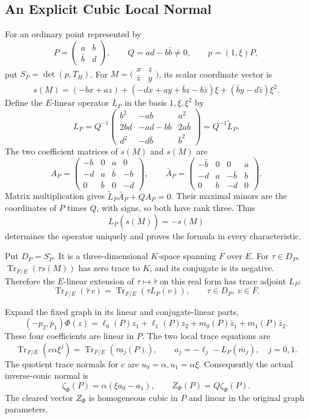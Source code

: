 \documentclass[12pt,letterpaper,onecolumn]{article}
\theoremstyle{definition}
\theoremstyle{remark}
\DeclareMathOperator{\Tr}{Tr}
\begin{document}
\subsection{An Explicit Cubic Local Normal}
For an ordinary point represented by
\[
P=\begin{pmatrix}a&b\\\bar b&d\end{pmatrix},\qquad
Q=ad-b\bar b\ne0,\qquad p=(1,\xi)P,
\]
put \(S_P=\det(p,T_H)\). For \(M=\bigl(\begin{smallmatrix}x&z\\\bar z&y\end{smallmatrix}\bigr)\), its scalar coordinate vector is
\[
s(M)=(-bx+az)+(-dx+ay+\bar bz-b\bar z)\xi
 +(\bar by-d\bar z)\xi^2.
\]
Define the \(E\)-linear operator \(L_P\) in the basis \(1,\xi,\xi^2\) by
\begin{equation}\label{eq:core-real-adjoint}
L_P=Q^{-1}
\begin{pmatrix}
b^2&-ab&a^2\\
2bd&-ad-b\bar b&2a\bar b\\
d^2&-d\bar b&\bar b^2
\end{pmatrix}=Q^{-1}\widetilde L_P.
\end{equation}
The two coefficient matrices of \(s(M)\) and \(\overline{s(M)}\) are
\[
A_P=\begin{pmatrix}-b&0&a&0\\-d&a&\bar b&-b\\0&\bar b&0&-d\end{pmatrix},
\qquad
\bar A_P=\begin{pmatrix}-\bar b&0&0&a\\-d&a&-\bar b&b\\0&b&-d&0\end{pmatrix}.
\]
Matrix multiplication gives
\(\widetilde L_P\bar A_P+QA_P=0\).
Their maximal minors are the coordinates of \(P\) times \(Q\), with signs, so both have rank three. Thus
\[
L_P(\overline{s(M)})=-s(M)
\]
determines the operator uniquely and proves the formula in every characteristic.

Put \(D_P=S_P^\circ\). It is a three-dimensional \(K\)-space spanning \(F\) over \(E\).
For \(\tau\in D_P\), \(\Tr_{F/E}(\tau s(M))\) has zero trace to \(K\), and its conjugate is its negative.
Therefore the \(E\)-linear extension of \(\tau\mapsto\bar\tau\) on this real form has trace adjoint \(L_P\):
\[
\Tr_{F/E}(\bar\tau\,v)=\Tr_{F/E}(\tau L_P(v)),
\qquad \tau\in D_P,\ v\in F.
\]

Expand the fixed graph in its linear and conjugate-linear parts,
\[
(-p_2,p_1)\Phi(z)
 =\ell_0(P)z_1+\ell_1(P)z_2+m_0(P)\bar z_1+m_1(P)\bar z_2.
\]
These four coefficients are linear in \(P\). The two local trace equations are
\[
\Tr_{F/E}(c\alpha\xi^j)
=\Tr_{F/E}(\tau a_j(P)),\qquad
a_j=-\ell_j-L_P(\bar m_j),\quad j=0,1.
\]
The quotient trace normals for \(c\) are \(u_0=\alpha,u_1=\alpha\xi\).
Consequently the actual inverse-conic normal is
\begin{equation}\label{eq:core-actual-cubic}
\zeta_\Phi(P)=\alpha(\xi a_0-a_1),\qquad
Z_\Phi(P)=Q\zeta_\Phi(P).
\end{equation}
The cleared vector \(Z_\Phi\) is homogeneous cubic in \(P\) and linear in the original graph parameters.
\end{document}

